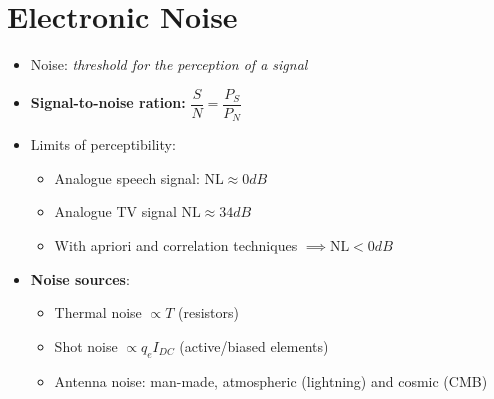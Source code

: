 \section{Electronic Noise}
\begin{itemize}
    \itemsep0pt
    \item Noise: \textit{threshold for the perception of a signal}
    \item \textbf{Signal-to-noise ration:} \(\dfrac{S}{N} = \dfrac{P_S}{P_N}\)
    \item Limits of perceptibility:
        \begin{itemize}
            \item Analogue speech signal: $\text{NL} \approx 0\si{dB}$
            \item Analogue TV signal $\text{NL} \approx 34\si{dB}$
            \item With apriori and correlation techniques \(\implies \text{NL} < 0\si{dB}\)
        \end{itemize}
    \item \textbf{Noise sources}:
        \begin{itemize}
            \item Thermal noise $\propto T$ (resistors)
            \item Shot noise $\propto q_e I_{DC}$ (active/biased elements)
            \item Antenna noise: man-made, atmospheric (lightning) and cosmic (CMB)
        \end{itemize}
\end{itemize}

